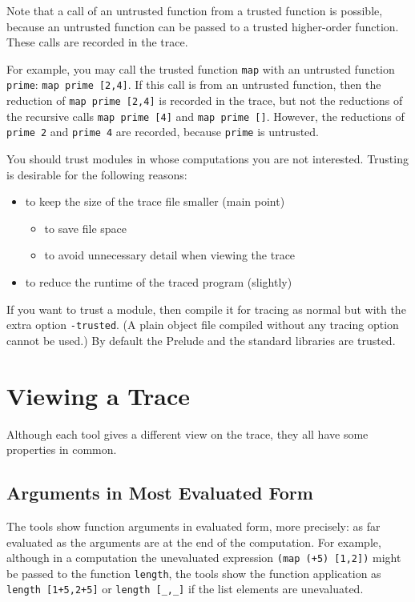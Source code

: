 \documentclass[12pt]{article}
\begin{document}
Note that a call of an untrusted function from a trusted function is
possible, because an untrusted function can be passed to a trusted
higher-order function. These calls are recorded in the trace.

For example, you may call the trusted function \texttt{map} with an
untrusted function \texttt{prime}: \texttt{map prime [2,4]}. If this
call is from an untrusted function, then the reduction of \texttt{map
prime [2,4]} is recorded in the trace, but not the reductions of
the recursive calls \texttt{map prime [4]} and \texttt{map prime
[]}. However, the reductions of \texttt{prime 2} and \texttt{prime 4}
are recorded, because \texttt{prime} is untrusted.

You should trust modules in whose computations you are not interested.
Trusting is desirable for the following reasons:
\begin{itemize}
\item to keep the size of the trace file smaller (main point)
\begin{itemize}
\item to save file space
\item to avoid unnecessary detail when viewing the trace
\end{itemize}
\item to reduce the runtime of the traced program (slightly)
\end{itemize}

If you want to trust a module, then compile it for tracing as normal
but with the extra option \texttt{-trusted}.  (A plain object file
compiled without any tracing option cannot be used.)  By default the
Prelude and the standard libraries are trusted.



\section{Viewing a Trace}\label{viewing}

Although each tool gives a different view on the trace, they all have
some properties in common.

\subsection{Arguments in Most Evaluated Form}

The tools show function arguments in evaluated form, more
precisely: as far evaluated as the arguments are at the end of the
computation. For example, although in a computation the unevaluated
expression \texttt{(map (+5) [1,2])} might be passed to the function
\texttt{length}, the tools show the function application as
\texttt{length [1+5,2+5]} or \texttt{length [\_,\_]} if the list
elements are unevaluated.
\end{document}
